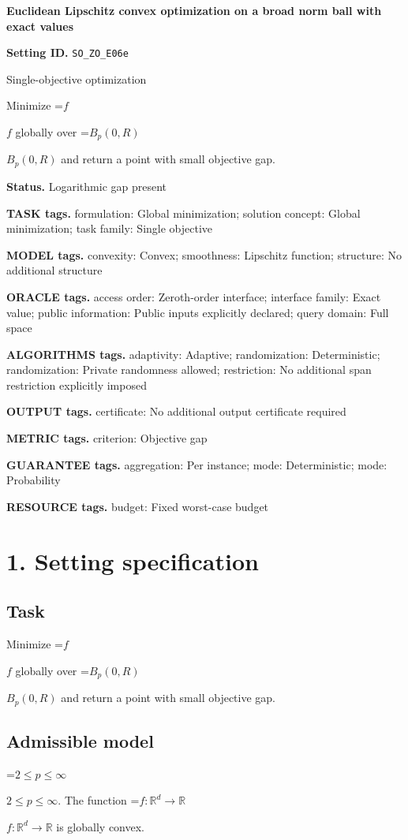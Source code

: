 \documentclass[10pt,a4paper]{article}
\newcommand{\AtlasMath}[1]{\par\begingroup\centering\setbox0=\hbox{$\displaystyle #1$}\ifdim\wd0>1.4\linewidth\typeout{ATLAS WIDE FORMULA: \the\wd0}\fi\ifdim\wd0>\linewidth\resizebox{\linewidth}{!}{\box0}\else\box0\fi\par\endgroup}
\newcommand{\AtlasInlineMath}[1]{\begingroup\setbox0=\hbox{$#1$}\ifdim\wd0>.4\linewidth\endgroup\AtlasMath{#1}\else\endgroup$#1$\fi}
\begin{document}
\raggedright

{\LARGE\bfseries\sffamily\color{AtlasNavy} Euclidean Lipschitz convex optimization on a broad norm ball with exact values\par}\vspace{5pt}
\textbf{Setting ID.} \texttt{SO\_\allowbreak{}ZO\_\allowbreak{}E06e}

Single-objective optimization

Minimize \AtlasInlineMath{f} globally over \AtlasInlineMath{B_p(0,R)} and return a point with small objective gap.

\textbf{Status.} Logarithmic gap present

\textbf{TASK tags.} formulation: Global minimization; solution concept: Global minimization; task family: Single objective

\textbf{MODEL tags.} convexity: Convex; smoothness: Lipschitz function; structure: No additional structure

\textbf{ORACLE tags.} access order: Zeroth-order interface; interface family: Exact value; public information: Public inputs explicitly declared; query domain: Full space

\textbf{ALGORITHMS tags.} adaptivity: Adaptive; randomization: Deterministic; randomization: Private randomness allowed; restriction: No additional span restriction explicitly imposed

\textbf{OUTPUT tags.} certificate: No additional output certificate required

\textbf{METRIC tags.} criterion: Objective gap

\textbf{GUARANTEE tags.} aggregation: Per instance; mode: Deterministic; mode: Probability

\textbf{RESOURCE tags.} budget: Fixed worst-case budget

\section{1. Setting specification}
\subsection{Task}
Minimize \AtlasInlineMath{f} globally over \AtlasInlineMath{B_p(0,R)} and return a point with small objective gap.

\subsection{Admissible model}
\AtlasInlineMath{2\le p\le\infty}. The function \AtlasInlineMath{f:\mathbb{R}^d\to\mathbb{R}} is globally convex.
\end{document}
